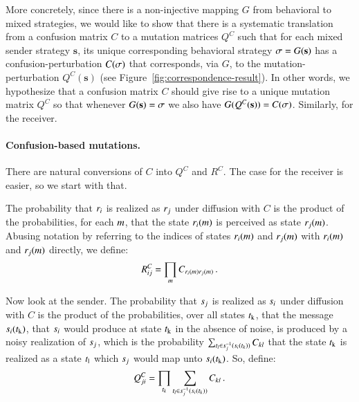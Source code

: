 \documentclass[fleqn,reqno,10pt]{article}
\renewcommand{\Smixed}{\ensuremath{\mathrm{\mathbf{s}}}}
\begin{document}
More concretely, since there is a non-injective mapping $G$ from
behavioral to mixed strategies, we would like to show that there is a
systematic translation from a confusion matrix $C$ to a mutation
matrices $Q^C$ such that for each mixed sender strategy $\Smixed$, its
unique corresponding behavioral strategy $\Sstrat = G(\Smixed)$ has a
confusion-perturbation $C(\sigma)$ that corresponds, via $G$, to the
mutation-perturbation $Q^C(\Smixed)$ (see
Figure~\ref{fig:correspondence-result}). In other words, we
hypothesize that a confusion matrix $C$ should give rise to a unique
mutation matrix $Q^C$ so that whenever $G(\Smixed) = \Sstrat$ we also
have $G(Q^C(\Smixed)) = C(\Sstrat)$. Similarly, for the receiver.

\paragraph{Confusion-based mutations.} There are natural conversions
of $C$ into $Q^C$ and $R^C$. The case for the receiver is easier, so
we start with that.

The probability that $r_i$ is realized as $r_j$ under
diffusion with $C$ is the product of the probabilities, for each
$m$, that the state $r_i(m)$ is perceived as state
$r_j(m)$. Abusing notation by referring to the indices of
states $r_i(m)$ and $r_j(m)$ with
$r_i(m)$ and $r_j(m)$ directly, we define:
\begin{align}
  \label{eq:construction-rec}
  R^C_{ij} = \prod_{m} C_{r_i(m)r_j(m)}\,.
\end{align}

Now look at the sender. The probability that $s_j$ is realized as
$s_i$ under diffusion with $C$ is the product of the
probabilities, over all states $t_{\mathrm{k}}$, that the message
$s_i(t_{\mathrm{k}})$, that $s_i$ would produce at state
$t_{\mathrm{k}}$ in the absence of noise, is produced by a noisy
realization of $s_j$, which is the probability $\sum_{t_l
  \in s_j^{-1}(s_i(t_k))} C_{kl}$ that the state
$t_{\mathrm{k}}$ is realized as a state $t_{\mathrm{l}}$ which $s_j$
would map unto $s_i(t_{\mathrm{k}})$. So, define:
\begin{align}
  \label{eq:construction-sen}
  Q^C_{ji} = \prod_{t_k} \sum_{t_l \in
    s_j^{-1}(s_i(t_k))} C_{kl}\,.
\end{align}
\end{document}

